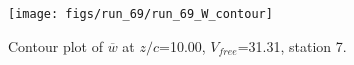 \begin{figure}[H]
\centering
\texttt{[image: figs/run\_69/run\_69\_W\_contour]}
\caption{Contour plot of $\overline{w}$ at $z/c$=10.00, $V_{free}$=31.31, station 7.}
\label{fig:run_69_W_contour}
\end{figure}


